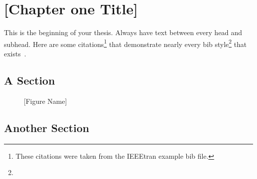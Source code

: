 \chapter{[Chapter one Title]}\label{ch:chapter1}

This is the beginning of your thesis. Always have text between every head 
and subhead. Here are some citations\footnote{These citations were taken
from the IEEEtran example bib file.} that demonstrate nearly every bib 
style\footnote{\lipsum[10]} that exists~\cite{IEEEhowto:IEEEtranpage,IEEEexample:shellCTANpage,
IEEEexample:IEEEwebsite,IEEEexample:bibtexuser,IEEEexample:bibtexdesign,
IEEEexample:tamethebeast,IEEEexample:bibtexguide,
IEEEexample:article_typical,IEEEexample:articleetal,IEEEexample:conf_typical,
IEEEexample:book_typical,IEEEexample:articlelargepages,
IEEEexample:articledualmonths,IEEEexample:TBPmisc,IEEEexample:TBParticle,
IEEEexample:bookwitheditor,IEEEexample:book,IEEEexample:bookwithseriesvolume,
IEEEexample:inbook,IEEEexample:inbookpagesnote,IEEEexample:incollection,
IEEEexample:incollectionwithseries,IEEEexample:incollection_chpp,
IEEEexample:incollectionmanyauthors,
IEEEexample:motmanualhowpub,IEEEexample:confwithadddays,
IEEEexample:confwithvolume,IEEEexample:confwithpaper,
IEEEexample:confwithpapertype,IEEEexample:presentedatconf,
IEEEexample:masters,IEEEexample:masterstype,IEEEexample:phdurl,
IEEEexample:techrep,IEEEexample:techreptype,IEEEexample:techreptypeii,
IEEEexample:techrepstdsub,IEEEexample:unpublished,IEEEexample:electronhowinfo,
IEEEexample:electronhowinfo2,IEEEexample:electronorgadd,IEEEexample:uspat,
IEEEexample:jppat,IEEEexample:frenchpatreq,IEEEexample:periodical,
IEEEexample:standard,IEEEexample:standardproposed,IEEEexample:draftasmisc,
IEEEexample:miscforum,IEEEexample:whitepaper,IEEEexample:datasheet,
IEEEexample:private,IEEEexample:miscrfc,IEEEexample:softmanual,
IEEEexample:softonline,IEEEexample:miscgermanreg,IEEEexample:bluebookstandard
}.

\section{A Section}\label{sec:something}
\lipsum[1-4] %

\begin{figure}
\framebox[\textwidth]{\parbox{\textwidth}{\lipsum[1]}} %
\caption{[Figure Name]}
\end{figure}

\section{Another Section}
\lipsum[2-3] %


